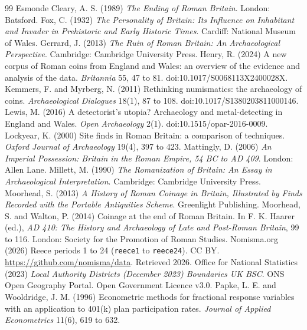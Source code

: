\documentclass[11pt,a4paper]{article}
\begin{document}
\begin{thebibliography}{99}
 Esmonde Cleary, A. S. (1989) \textit{The Ending of Roman Britain}. London: Batsford.
 Fox, C. (1932) \textit{The Personality of Britain: Its Influence on Inhabitant and Invader in Prehistoric and Early Historic Times}. Cardiff: National Museum of Wales.
 Gerrard, J. (2013) \textit{The Ruin of Roman Britain: An Archaeological Perspective}. Cambridge: Cambridge University Press.
 Henry, R. (2024) A new corpus of Roman coins from England and Wales: an overview of the evidence and analysis of the data. \textit{Britannia} 55, 47 to 81. doi:10.1017/S0068113X2400028X.
 Kemmers, F. and Myrberg, N. (2011) Rethinking numismatics: the archaeology of coins. \textit{Archaeological Dialogues} 18(1), 87 to 108. doi:10.1017/S1380203811000146.
 Lewis, M. (2016) A detectorist's utopia? Archaeology and metal-detecting in England and Wales. \textit{Open Archaeology} 2(1). doi:10.1515/opar-2016-0009.
 Lockyear, K. (2000) Site finds in Roman Britain: a comparison of techniques. \textit{Oxford Journal of Archaeology} 19(4), 397 to 423.
 Mattingly, D. (2006) \textit{An Imperial Possession: Britain in the Roman Empire, 54 BC to AD 409}. London: Allen Lane.
 Millett, M. (1990) \textit{The Romanization of Britain: An Essay in Archaeological Interpretation}. Cambridge: Cambridge University Press.
 Moorhead, S. (2013) \textit{A History of Roman Coinage in Britain, Illustrated by Finds Recorded with the Portable Antiquities Scheme}. Greenlight Publishing.
 Moorhead, S. and Walton, P. (2014) Coinage at the end of Roman Britain. In F. K. Haarer (ed.), \textit{AD 410: The History and Archaeology of Late and Post-Roman Britain}, 99 to 116. London: Society for the Promotion of Roman Studies.
 Nomisma.org (2026) Reece periods 1 to 24 (\texttt{reece1} to \texttt{reece24}). CC BY. \url{https://github.com/nomisma/data}. Retrieved 2026.
 Office for National Statistics (2023) \textit{Local Authority Districts (December 2023) Boundaries UK BSC}. ONS Open Geography Portal. Open Government Licence v3.0.
 Papke, L. E. and Wooldridge, J. M. (1996) Econometric methods for fractional response variables with an application to 401(k) plan participation rates. \textit{Journal of Applied Econometrics} 11(6), 619 to 632.

\end{thebibliography}
\end{document}
